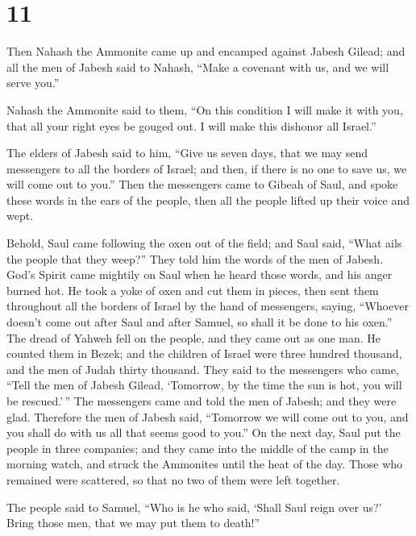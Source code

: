 \hypertarget{section-10}{%
\section{11}\label{section-10}}

 Then Nahash the Ammonite came up and encamped against
Jabesh Gilead; and all the men of Jabesh said to Nahash, ``Make a
covenant with us, and we will serve you.''

 Nahash the Ammonite said to them, ``On this condition I
will make it with you, that all your right eyes be gouged out. I will
make this dishonor all Israel.''

 The elders of Jabesh said to him, ``Give us seven days,
that we may send messengers to all the borders of Israel; and then, if
there is no one to save us, we will come out to you.'' 
Then the messengers came to Gibeah of Saul, and spoke these words in the
ears of the people, then all the people lifted up their voice and wept.

 Behold, Saul came following the oxen out of the field;
and Saul said, ``What ails the people that they weep?'' They told him
the words of the men of Jabesh.  God's Spirit came
mightily on Saul when he heard those words, and his anger burned hot.
 He took a yoke of oxen and cut them in pieces, then sent
them throughout all the borders of Israel by the hand of messengers,
saying, ``Whoever doesn't come out after Saul and after Samuel, so shall
it be done to his oxen.'' The dread of Yahweh fell on the people, and
they came out as one man.  He counted them in Bezek; and
the children of Israel were three hundred thousand, and the men of Judah
thirty thousand.  They said to the messengers who came,
``Tell the men of Jabesh Gilead, `Tomorrow, by the time the sun is hot,
you will be rescued.'\,'' The messengers came and told the men of
Jabesh; and they were glad.  Therefore the men of Jabesh
said, ``Tomorrow we will come out to you, and you shall do with us all
that seems good to you.''  On the next day, Saul put the
people in three companies; and they came into the middle of the camp in
the morning watch, and struck the Ammonites until the heat of the day.
Those who remained were scattered, so that no two of them were left
together.

 The people said to Samuel, ``Who is he who said, `Shall
Saul reign over us?' Bring those men, that we may put them to death!''

